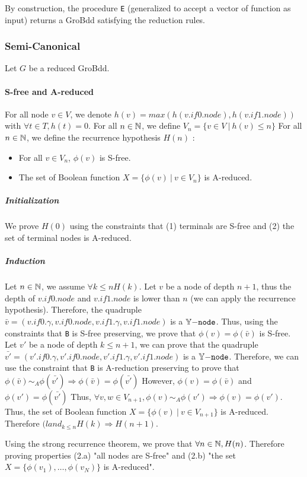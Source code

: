 \documentclass[a4paper,10pt]{article}
\begin{document}
By construction, the procedure \texttt{E} (generalized to accept a vector of function as input) returns a GroBdd satisfying the reduction rules.

\subsubsection{Semi-Canonical}

Let $G$ be a reduced GroBdd.

\paragraph{S-free and A-reduced}
For all node $v\in V$, we denote $h(v) = max(h(v.if0.node), h(v.if1.node))$ with $\forall t\in T, h(t) = 0$.
For all $n\in\mathbb{N}$, we define $V_n = \{v\in V ~|~ h(v) \leq n\}$
For all $n\in\mathbb{N}$, we define the recurrence hypothesis $H(n)$ :\begin{itemize}
\item For all $v\in V_n$, $\phi(v)$ is S-free.
\item The set of Boolean function $X = \{\phi(v) ~|~ v\in V_n\}$ is A-reduced.
\end{itemize}

\subparagraph{Initialization}
We prove $H(0)$ using the constraints that (1) terminals are S-free and (2) the set of terminal nodes is A-reduced.

\subparagraph{Induction}
Let $n\in\mathbb{N}$, we assume $\forall k\leq n H(k)$.
Let $v$ be a node of depth $n+1$, thus the depth of $v.if0.node$ and $v.if1.node$ is lower than $n$ (we can apply the recurrence hypothesis).
Therefore, the quadruple $\bar{v} = (v.if0.\gamma, v.if0.node, v.if1.\gamma, v.if1.node)$ is a $\mathbb{Y}\mathtt{-node}$.
Thus, using the constraints that \texttt{B} is S-free preserving, we prove that $\phi(v) = \phi(\bar{v})$ is S-free.
Let $v'$ be a node of depth $k\leq n+1$, we can prove that the quadruple $\bar{v'} = (v'.if0.\gamma, v'.if0.node, v'.if1.\gamma, v'.if1.node)$ is a $\mathbb{Y}\mathtt{-node}$.
Therefore, we can use the constraint that \texttt{B} is A-reduction preserving to prove that $\phi(\bar{v}) \sim_A \phi(\bar{v'}) \Rightarrow \phi(\bar{v}) = \phi(\bar{v'})$
However, $\phi(v) = \phi(\bar{v})$ and $\phi(v') = \phi(\bar{v'})$
Thus, $\forall v, w \in V_{n+1}, \phi(v) \sim_A \phi(v') \Rightarrow \phi(v) = \phi(v')$.
Thus, the set of Boolean function $X = \{\phi(v) ~|~ v\in V_{n+1}\}$ is A-reduced.
Therefore $(land_{k\leq n} H(k) \Rightarrow H(n+1)$.

Using the strong recurrence theorem, we prove that $\forall n\in\mathbb{N}, H(n)$.
Therefore proving properties (2.a) "all nodes are S-free" and (2.b) "the set $X = \{\phi(v_1), \dots, \phi(v_N)\}$ is A-reduced".
\end{document}
